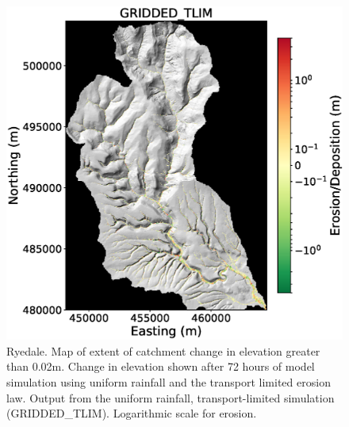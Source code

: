 \begin{figure}[t]
\includegraphics[width=16cm]{chp06_figures_scripts/figure_ryedale_elev_diff_grid_tlim.eps}
\caption{Ryedale. Map of extent of catchment change in elevation greater than 0.02m. Change in elevation shown after 72 hours of model simulation using uniform rainfall and the transport limited erosion law. Output from the uniform rainfall, transport-limited simulation (GRIDDED\_TLIM). Logarithmic scale for erosion.}
\label{fig_ryedale_erodediff_gridded_tlim}
\end{figure}

%

